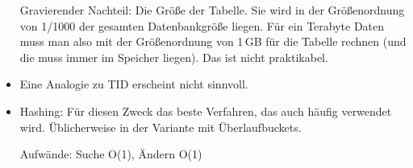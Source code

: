 \begin{solution}
\begin{itemize}
	Gravierender Nachteil: Die Größe der Tabelle. Sie wird in der Größenordnung von 1/1000 der gesamten Datenbankgröße liegen. Für ein Terabyte Daten muss man also mit der Größenordnung von 1\,GB für die Tabelle rechnen (und die muss immer im Speicher liegen). Das ist nicht praktikabel.

	\item Eine Analogie zu TID erscheint nicht sinnvoll.

	\item Hashing: Für diesen Zweck das beste Verfahren, das auch häufig verwendet wird. Üblicherweise in der Variante mit Überlaufbuckets.

	Aufwände: Suche O(1), Ändern O(1)

\end{itemize}
\end{solution}
